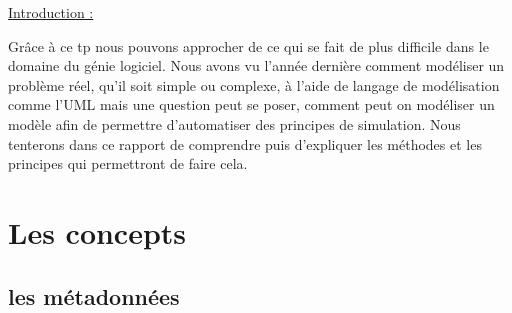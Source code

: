 \documentclass[a4paper,11pt]{report}
\begin{document}
\begin{flushleft}
\LARGE{ \underline {Introduction :}\bigskip}
\end{flushleft}

\normalsize{
Grâce à ce tp nous pouvons approcher de ce qui se fait de plus difficile dans le domaine du génie logiciel.
Nous avons vu l'année dernière comment modéliser un problème réel, qu'il soit simple ou complexe, à l'aide de langage de modélisation comme l'UML mais une question peut se poser, comment peut on modéliser un modèle afin de permettre d'automatiser des principes de simulation. Nous tenterons dans ce rapport de comprendre puis d'expliquer les méthodes et les principes qui permettront de faire cela.
}



\chapter{Les concepts}

\section{les métadonnées}
\end{document}
